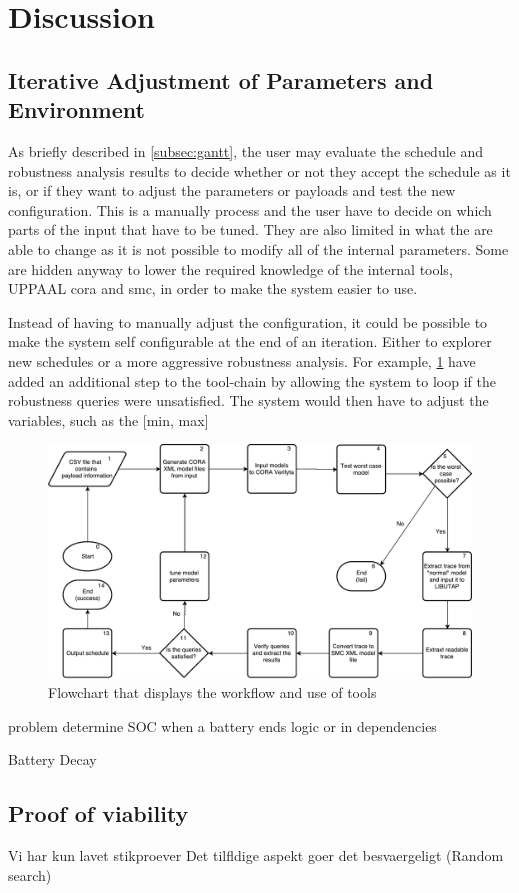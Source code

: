\section{Discussion} \label{sec:discussion}

\subsection{Iterative Adjustment of Parameters and Environment} \label{subsec:disc_itt}
As briefly described in \cref{subsec:gantt}, the user may evaluate the schedule and robustness analysis results to decide whether or not they accept the schedule as it is, or if they want to adjust the parameters or payloads and test the new configuration. This is a manually process and the user have to decide on which parts of the input that have to be tuned. They are also limited in what the are able to change as it is not possible to modify all of the internal parameters. Some are hidden anyway to lower the required knowledge of the internal tools, UPPAAL \gls{cora} and \gls{smc}, in order to make the system easier to use. 

Instead of having to manually adjust the configuration, it could be possible to make the system self configurable at the end of an iteration. Either to explorer new schedules or a more aggressive robustness analysis. For example, \cref{fig:tool_self_config}  have added an additional step to the tool-chain by allowing the system to loop if the robustness queries were unsatisfied. The system would then have to adjust the variables, such as the [min, max]

\begin{figure}[h]
	\includegraphics[width=\textwidth]{graphics/tool_chain.pdf}
	\caption{Flowchart that displays the workflow and use of tools}
	\label{fig:tool_self_config}
\end{figure}

problem determine SOC when a battery ends 
logic or in dependencies

Battery Decay


\subsection{Proof of viability}
Vi har kun lavet stikproever
Det tilfldige aspekt goer det besvaergeligt (Random search)